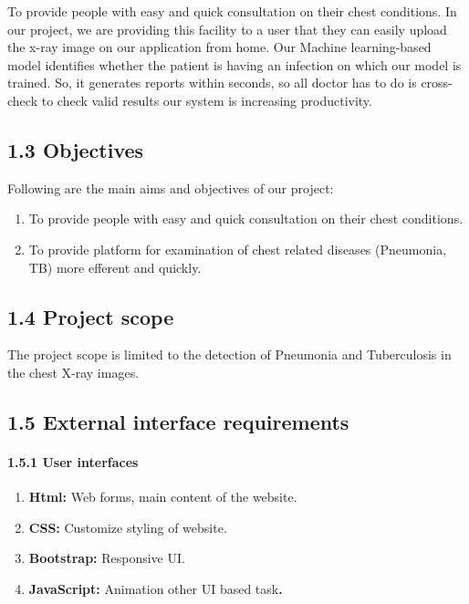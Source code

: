 \documentclass{article} %
\begin{document}
\noindent To provide people with easy and quick consultation on their chest conditions. In our project, we are providing this facility to a user that they can easily upload the x-ray image on our application from home. Our Machine learning-based model identifies whether the patient is having an infection on which our model is trained. So, it generates reports within seconds, so all doctor has to do is cross-check to check valid results our system is increasing productivity.

\noindent 
\subsection{1.3 Objectives}

\noindent Following are the main aims and objectives of our project:

\begin{enumerate}
\item  To provide people with easy and quick consultation on their chest conditions.

\item  To provide platform for examination of chest related diseases (Pneumonia, TB) more efferent and quickly.
\end{enumerate}

\noindent 
\subsection{1.4 Project scope}

\noindent The project scope is limited to the detection of Pneumonia and Tuberculosis in the chest X-ray images.

\noindent 
\subsection{1.5 External interface requirements}

\noindent 
\paragraph{1.5.1 User interfaces}

\begin{enumerate}
\item  \textbf{Html: }Web forms, main content of the website.\textbf{}

\item \textbf{ CSS: }Customize styling of website.\textbf{}

\item \textbf{ Bootstrap: }Responsive UI.\textbf{}

\item \textbf{ JavaScript: }Animation other UI based task\textbf{.} \textbf{}
\end{enumerate}
\end{document}
